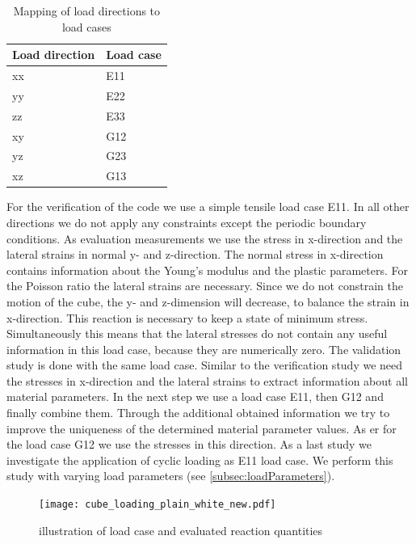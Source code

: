     \begin{table}[h!] 
    \centering
    \caption{Mapping of load directions to load cases}
    \label{tab:LoadCaseMapping}
    \renewcommand{\arraystretch}{1.1}
    \begin{tabular}{C{0.2\textwidth}C{0.15\textwidth}}
    \toprule
    \textbf{Load direction} & \textbf{Load case} \\ \midrule
    xx & E11 \\ \hline
    yy & E22 \\ \hline
    zz & E33  \\ \hline
    xy & G12 \\ \hline
    yz & G23 \\ \hline
    xz & G13 \\ \bottomrule
    \end{tabular}
    
    \end{table}

    For the verification of the code we use a simple tensile load case E11.
    In all other directions we do not apply any constraints except the periodic boundary conditions. As evaluation measurements we use the stress in x-direction and the lateral strains in normal y- and z-direction. The normal stress in x-direction contains information about the Young's modulus and the plastic parameters. For the Poisson ratio the lateral strains are necessary. Since we do not constrain the motion of the cube, the y- and z-dimension will decrease, to balance the strain in x-direction. This reaction is necessary to keep a state of minimum stress. Simultaneously this means that the lateral stresses do not contain any useful information in this load case, because they are numerically zero. 
    The validation study is done with the same load case. Similar to the verification study we need the stresses in x-direction and the lateral strains to extract information about all material parameters. 
    In the next step we use a load case E11, then G12 and finally combine them. Through the additional obtained information we try to improve the uniqueness of the determined material parameter values. As \acrlong{er} for the load case G12 we use the stresses in this direction.
    As a last study we investigate the application of cyclic loading as E11 load case. We perform this study with varying load parameters (see \autoref{subsec:loadParameters}). 


    \begin{figure}
		\centering
        \texttt{[image: cube\_loading\_plain\_white\_new.pdf]}
		\caption{illustration of load case and evaluated reaction quantities}
		\label{fig:evaluationMeasurements}
	\end{figure}

